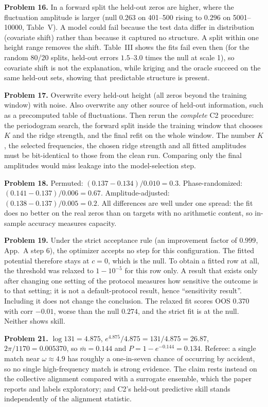 \textbf{Problem 16.} In a forward split the held-out zeros are higher, where the fluctuation amplitude is larger (null $0.263$ on 401--500 rising to $0.296$ on 5001--10000, Table~V). A model could fail because the test data differ in distribution (covariate shift) rather than because it captured no structure. A split within one height range removes the shift. Table~III shows the fits fail even then (for the random 80/20 splits, held-out errors $1.5$--$3.0$ times the null at scale 1), so covariate shift is not the explanation, while kriging and the oracle succeed on the same held-out sets, showing that predictable structure is present.

\textbf{Problem 17.} Overwrite every held-out height (all zeros beyond the training window) with noise. Also overwrite any other source of held-out information, such as a precomputed table of fluctuations. Then rerun the \emph{complete} C2 procedure: the periodogram search, the forward split inside the training window that chooses $K$ and the ridge strength, and the final refit on the whole window. The number $K$, the selected frequencies, the chosen ridge strength and all fitted amplitudes must be bit-identical to those from the clean run. Comparing only the final amplitudes would miss leakage into the model-selection step.

\textbf{Problem 18.} Permuted: $(0.137-0.134)/0.010=0.3$. Phase-randomized: $(0.141-0.137)/0.006=0.67$. Amplitude-adjusted: $(0.138-0.137)/0.005=0.2$. All differences are well under one spread: the fit does no better on the real zeros than on targets with no arithmetic content, so in-sample accuracy measures capacity.

\textbf{Problem 19.} Under the strict acceptance rule (an improvement factor of $0.999$, App.~A step 6), the optimizer accepts no step for this configuration. The fitted potential therefore stays at $c=0$, which is the null. To obtain a fitted row at all, the threshold was relaxed to $1-10^{-5}$ for this row only. A result that exists only after changing one setting of the protocol measures how sensitive the outcome is to that setting; it is not a default-protocol result, hence ``sensitivity result''. Including it does not change the conclusion. The relaxed fit scores OOS $0.370$ with corr $-0.01$, worse than the null $0.274$, and the strict fit is at the null. Neither shows skill.

\textbf{Problem 21.} $\log131=4.875$, $e^{4.875}/4.875=131/4.875=26.87$, $2\pi/1170=0.005370$, so $\bar m=0.144$ and $P=1-e^{-0.144}=0.134$. Referee: a single match near $\omega\approx4.9$ has roughly a one-in-seven chance of occurring by accident, so no single high-frequency match is strong evidence. The claim rests instead on the collective alignment compared with a surrogate ensemble, which the paper reports and labels exploratory; and C2's held-out predictive skill stands independently of the alignment statistic.

